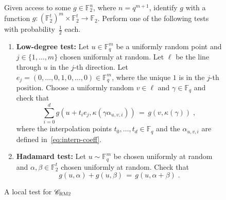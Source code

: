 \documentclass[11pt]{article}
\theoremstyle{definition}
\newcommand{\code}{\mathscr{C}}
\newcommand{\F}{\ensuremath{\mathbb{F}}}
\newcommand{\bRM}{\ensuremath{\textsc{RM2}}}
\newenvironment{gamespec}{
  \begin{mdframed}[style=figstyle]}{
  \end{mdframed}}
\begin{document}
\begin{figure}[!htbp]
  \centering
  \begin{gamespec}
Given access to some $g\in \F_2^{n}$, where $n=q^{m+1}$, identify $g$ with a function $g:(\F_2^t)^m \times \F_2^t \to \F_2$. Perform one of the following tests with probability~$\tfrac{1}{2}$ each. 
\begin{enumerate}
	\item \textbf{Low-degree test:}
		Let $u \in \F_q^m$ be a uniformly random point and $j\in \{1,\ldots,m\}$ chosen uniformly at random. Let $\ell$ be the line through $u$ in the $j$-th direction. Let $e_j=(0,\ldots,0,1,0,\ldots,0)\in \F_q^m$, where the unique $1$ is in the $j$-th position. Choose a uniformly random $v\in \ell$ and $\gamma\in \F_q$ and check that 
		\[\sum_{i=0}^d g(u+t_i e_j,\kappa(\gamma \alpha_{u,v,i})) \,=\, g(v,\kappa(\gamma))\;,\]
		where the interpolation points $t_0,\ldots,t_d \in \F_q$ and the $\alpha_{u,v,i}$ are defined in~\eqref{eq:interp-coeff}.
	\item \textbf{Hadamard test:} Let $u\sim\F_q^m$ be chosen uniformly at random and $\alpha,\beta\in \F_2^t$ chosen uniformly at random. Check that 
	\[g(u,\alpha)+g(u,\beta)\,=\,g(u,\alpha+\beta)\;.\] 	
    \end{enumerate}
  \end{gamespec}
  \caption{A local test for $\code_{\bRM}$}
  \label{fig:bRM-tester}
\end{figure}
\end{document}
